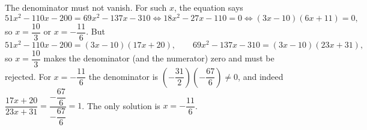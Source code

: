 The denominator must not vanish. For such $x$, the equation says
\[51x^2-110x-200=69x^2-137x-310\iff18x^2-27x-110=0\iff(3x-10)(6x+11)=0,\]
so $x=\dfrac{10}{3}$ or $x=-\dfrac{11}{6}$. But
\[51x^2-110x-200=(3x-10)(17x+20),\qquad69x^2-137x-310=(3x-10)(23x+31),\]
so $x=\dfrac{10}{3}$ makes the denominator (and the numerator) zero and must be rejected. For $x=-\dfrac{11}{6}$ the denominator is $\left(-\dfrac{31}{2}\right)\left(-\dfrac{67}{6}\right)\ne0$, and indeed $\dfrac{17x+20}{23x+31}=\dfrac{-\dfrac{67}{6}}{-\dfrac{67}{6}}=1$. The only solution is $\boxed{x=-\dfrac{11}{6}}$.
